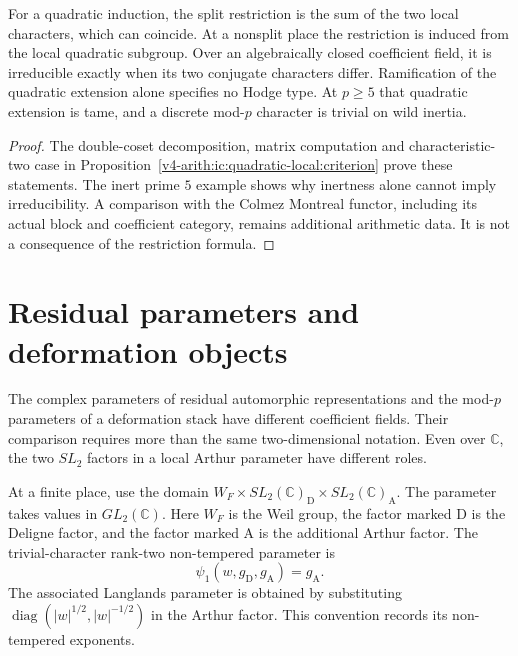 \begin{lemma}
\label{v4-arith:ic:w6-e:lem:CP-induced}
For a quadratic induction, the split restriction is the sum of the two
local characters, which can coincide. At a nonsplit place the restriction is induced from the local
quadratic subgroup. Over an algebraically closed coefficient field,
it is irreducible exactly when its two conjugate characters differ. Ramification of the quadratic
extension alone specifies no Hodge type. At $p\ge5$ that quadratic
extension is tame, and a discrete mod-$p$ character is trivial on wild inertia.
\end{lemma}
\begin{proof}
The double-coset decomposition, matrix computation and characteristic-two
case in Proposition~\ref{v4-arith:ic:quadratic-local:criterion} prove these
statements. The inert prime $5$ example shows why inertness alone cannot
imply irreducibility. A comparison with the Colmez Montreal functor,
including its actual block and coefficient category, remains additional
arithmetic data. It is not a consequence of the restriction formula.
\end{proof}


\section{Residual parameters and deformation objects}
\label{v4-arith:ic:w10-d:X2}

The complex parameters of residual automorphic representations and the mod-$p$
parameters of a deformation stack have different coefficient fields.
Their comparison requires more than the same two-dimensional notation.
Even over $\mathbb C$, the two $SL_2$ factors in a local Arthur parameter
have different roles.

\begin{definition}
\label{v4-arith:ic:w10-d:def:arthur-param-s1}
At a finite place, use the domain
$W_F\times SL_2(\mathbb C)_{\mathrm D}\times SL_2(\mathbb C)_{\mathrm A}$.
The parameter takes values in $GL_2(\mathbb C)$.
Here $W_F$ is the Weil group, the factor marked $\mathrm D$ is the
Deligne factor, and the factor marked $\mathrm A$ is the additional
Arthur factor. The trivial-character rank-two non-tempered parameter is
\begin{equation}\label{v4-arith:ic:w10-d:eq:arthur-param-s1}
 \psi_1(w,g_{\mathrm D},g_{\mathrm A})=g_{\mathrm A}.
\end{equation}
The associated Langlands parameter is obtained by substituting
$\operatorname{diag}(|w|^{1/2},|w|^{-1/2})$ in the Arthur factor.
This convention records its non-tempered exponents.
\end{definition}

